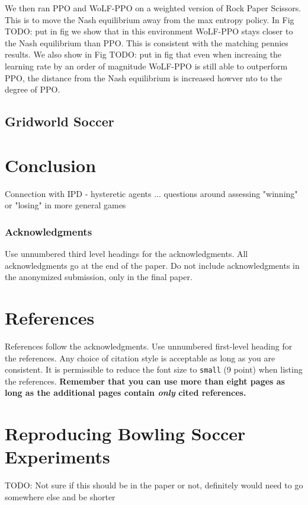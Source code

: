 \documentclass{article}
\newcommand\TODO[1]{{\color{red}TODO: #1}}
\begin{document}
We then ran PPO and WoLF-PPO on a weighted version of Rock Paper Scissors. This is to move the Nash equilibrium away from the max entropy policy. In Fig \TODO{put in fig} we show that in this environment WoLF-PPO stays closer to the Nash equilibrium than PPO. This is consistent with the matching pennies results. We also show in Fig \TODO{put in fig} that even when increaing the learning rate by an order of magnitude WoLF-PPO is still able to outperform PPO, the distance from the Nash equilibrium is increased howver nto to the degree of PPO.

\subsection{Gridworld Soccer}

\section{Conclusion}

Connection with IPD - hysteretic agents ... questions around assessing "winning" or "losing" in more general games

\subsubsection*{Acknowledgments}

Use unnumbered third level headings for the acknowledgments. All acknowledgments
go at the end of the paper. Do not include acknowledgments in the anonymized
submission, only in the final paper.

\section*{References}

References follow the acknowledgments. Use unnumbered first-level heading for
the references. Any choice of citation style is acceptable as long as you are
consistent. It is permissible to reduce the font size to \verb+small+ (9 point)
when listing the references. {\bf Remember that you can use more than eight
  pages as long as the additional pages contain \emph{only} cited references.}
  
\section*{Reproducing Bowling Soccer Experiments}

\TODO{Not sure if this should be in the paper or not, definitely would need to go somewhere else and be shorter}
\end{document}
